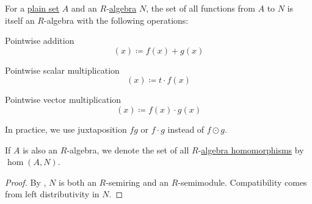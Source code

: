 \begin{proposition}\label{thm:functions_over_algebra}
  For a \hyperref[def:set]{plain set} \( A \) and an \( R \)-\hyperref[def:algebra_over_semiring]{algebra} \( N \), the set of all functions from \( A \) to \( N \) is itself an \( R \)-algebra with the following operations:
  \begin{thmenum}
     Pointwise addition
    \begin{equation*}
      [f + g](x) \coloneqq f(x) + g(x)
    \end{equation*}

     Pointwise scalar multiplication
    \begin{equation*}
      [t \cdot f](x) \coloneqq t \cdot f(x)
    \end{equation*}

     Pointwise vector multiplication
    \begin{equation*}
      [f \odot g](x) \coloneqq f(x) \cdot g(x)
    \end{equation*}

    In practice, we use juxtaposition \( fg \) or \( f \cdot g \) instead of \( f \odot g \).
  \end{thmenum}

  If \( A \) is also an \( R \)-algebra, we denote the set of all \( R \)-\hyperref[def:algebra_over_semiring/homomorphism]{algebra homomorphisms} by \( \hom(A, N) \).
\end{proposition}
\begin{proof}
  By , \( N \) is both an \( R \)-semiring and an \( R \)-semimodule. Compatibility comes from left distributivity in \( N \).
\end{proof}

